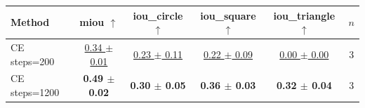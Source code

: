 \begin{tabular}{lccccc}
\toprule
Method & miou $\uparrow$ & iou\_circle $\uparrow$ & iou\_square $\uparrow$ & iou\_triangle $\uparrow$ & $n$ \\
\midrule
CE steps=200 & \underline{0.34 $\pm$ 0.01} & \underline{0.23 $\pm$ 0.11} & \underline{0.22 $\pm$ 0.09} & \underline{0.00 $\pm$ 0.00} & 3 \\
CE steps=1200 & \textbf{0.49 $\pm$ 0.02} & \textbf{0.30 $\pm$ 0.05} & \textbf{0.36 $\pm$ 0.03} & \textbf{0.32 $\pm$ 0.04} & 3 \\
\bottomrule
\end{tabular}
